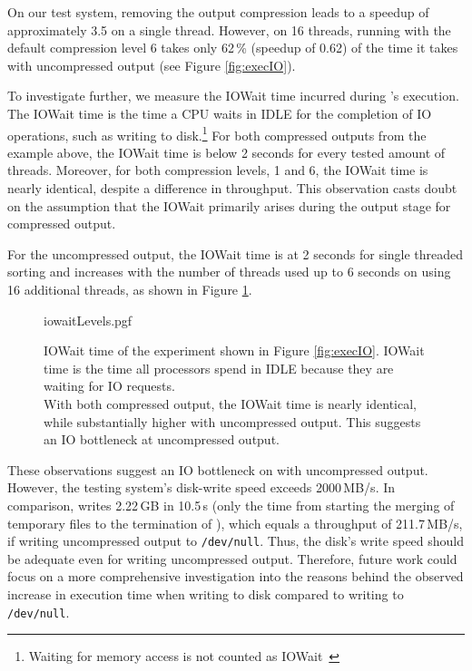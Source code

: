 On our test system, removing the output compression leads to a speedup of approximately 3.5 on a single thread. However, on 16 threads, running \sort with the default compression level 6 takes only 62\,\% (speedup of 0.62) of the time it takes with uncompressed output (see Figure \ref{fig:execIO}).

To investigate further, we measure the IOWait time incurred during \sort's execution. The IOWait time is the time a CPU waits in IDLE for the completion of IO operations, such as writing to disk.\footnote{Waiting for memory access is not counted as IOWait~\cite{noauthor_iostat1_nodate}} For both compressed outputs from the example above, the IOWait time is below 2 seconds for every tested amount of threads. Moreover, for both compression levels, 1 and 6, the IOWait time is nearly identical, despite a difference in throughput. This observation casts doubt on the assumption that the IOWait primarily arises during the output stage for compressed output. 

For the uncompressed output, the IOWait time is at 2 seconds for single threaded sorting and increases with the number of threads used up to 6 seconds on using 16 additional threads, as shown in Figure \ref{fig:iowait}.
\begin{figure}[htb]
        {iowaitLevels.pgf}
    \caption{IOWait time of the experiment shown in Figure \ref{fig:execIO}. IOWait time is the time all processors spend in IDLE because they are waiting for IO requests. \threads \points \\
    With both compressed output, the IOWait time is nearly identical, while substantially higher with uncompressed output. This suggests an IO bottleneck at uncompressed output.
    }
    \label{fig:iowait}
\end{figure}
These observations suggest an IO bottleneck on \sort with uncompressed output. However, the testing system's disk-write speed exceeds 2000\,MB/s. In comparison, \sort writes 2.22\,GB in 10.5\,s (only the time from starting the merging of temporary files to the termination of \sort), which equals a throughput of 211.7\,MB/s, if writing uncompressed output to \texttt{/dev/null}. Thus, the disk's write speed should be adequate even for writing uncompressed output. Therefore, future work could focus on a more comprehensive investigation into the reasons behind the observed increase in execution time when writing to disk compared to writing to \texttt{/dev/null}.



